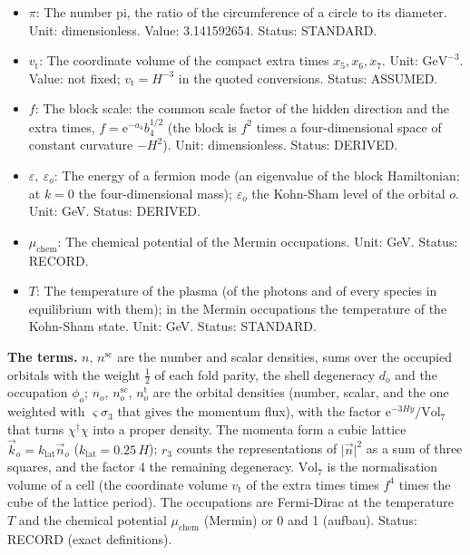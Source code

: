 \documentclass[
  10pt,
]{article}
\begin{document}
\begin{itemize}
  Kohn-Sham cell. Unit: GeV. Value: \(0.25\,H\). Status: RECORD.
\item
  \(\pi\): The number pi, the ratio of the circumference of a circle to
  its diameter. Unit: dimensionless. Value: 3.141592654. Status:
  STANDARD.
\item
  \(v_{\mathrm{t}}\): The coordinate volume of the compact extra times
  \(x_5, x_6, x_7\). Unit: \(\mathrm{GeV}^{-3}\). Value: not fixed;
  \(v_{\mathrm{t}} = H^{-3}\) in the quoted conversions. Status:
  ASSUMED.
\item
  \(f\): The block scale: the common scale factor of the hidden
  direction and the extra times, \(f = \mathrm{e}^{-a_4}b_4^{1/2}\) (the
  block is \(f^2\) times a four-dimensional space of constant curvature
  \(-H^2\)). Unit: dimensionless. Status: DERIVED.
\item
  \(\varepsilon,\ \varepsilon_o\): The energy of a fermion mode (an
  eigenvalue of the block Hamiltonian; at \(k = 0\) the four-dimensional
  mass); \(\varepsilon_o\) the Kohn-Sham level of the orbital \(o\).
  Unit: GeV. Status: DERIVED.
\item
  \(\mu_{\mathrm{chem}}\): The chemical potential of the Mermin
  occupations. Unit: GeV. Status: RECORD.
\item
  \(T\): The temperature of the plasma (of the photons and of every
  species in equilibrium with them); in the Mermin occupations the
  temperature of the Kohn-Sham state. Unit: GeV. Status: STANDARD.
\end{itemize}

\textbf{The terms.} \(n\), \(n^{\mathrm{sc}}\) are the number and scalar
densities, sums over the occupied orbitals with the weight \(\frac12\)
of each fold parity, the shell degeneracy \(d_o\) and the occupation
\(\phi_o\); \(n_o\), \(n^{\mathrm{sc}}_o\), \(n^{\mathrm{t}}_o\) are the
orbital densities (number, scalar, and the one weighted with
\(\varsigma\sigma_3\) that gives the momentum flux), with the factor
\(\mathrm{e}^{-3Hy}/\mathrm{Vol}_7\) that turns \(\chi^\dagger\chi\)
into a proper density. The momenta form a cubic lattice
\(\vec k_o = k_{\mathrm{lat}}\vec n_o\)
(\(k_{\mathrm{lat}} = 0.25\,H\)); \(r_3\) counts the representations of
\(\lvert\vec n\rvert^2\) as a sum of three squares, and the factor 4 the
remaining degeneracy. \(\mathrm{Vol}_7\) is the normalisation volume of
a cell (the coordinate volume \(v_{\mathrm{t}}\) of the extra times
times \(f^4\) times the cube of the lattice period). The occupations are
Fermi-Dirac at the temperature \(T\) and the chemical potential
\(\mu_{\mathrm{chem}}\) (Mermin) or 0 and 1 (aufbau). Status: RECORD
(exact definitions).
\end{document}
